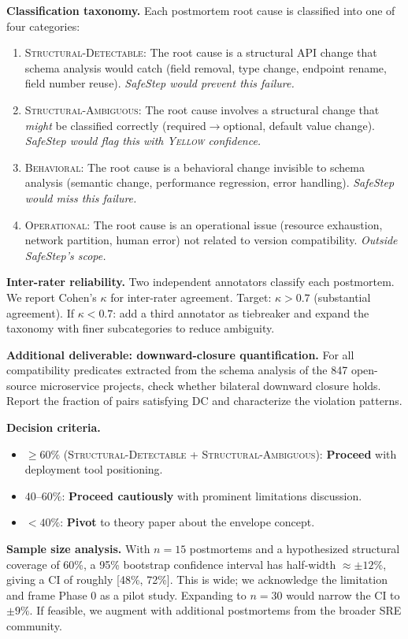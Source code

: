 \documentclass[10pt,twocolumn]{article}
\begin{document}
\textbf{Classification taxonomy.} Each postmortem root cause is classified into one of four categories:
\begin{enumerate}
\item \textsc{Structural-Detectable}: The root cause is a structural API change that schema analysis would catch (field removal, type change, endpoint rename, field number reuse). \emph{SafeStep would prevent this failure.}
\item \textsc{Structural-Ambiguous}: The root cause involves a structural change that \emph{might} be classified correctly (required$\to$optional, default value change). \emph{SafeStep would flag this with \textsc{Yellow} confidence.}
\item \textsc{Behavioral}: The root cause is a behavioral change invisible to schema analysis (semantic change, performance regression, error handling). \emph{SafeStep would miss this failure.}
\item \textsc{Operational}: The root cause is an operational issue (resource exhaustion, network partition, human error) not related to version compatibility. \emph{Outside SafeStep's scope.}
\end{enumerate}

\textbf{Inter-rater reliability.} Two independent annotators classify each postmortem. We report Cohen's $\kappa$ for inter-rater agreement. Target: $\kappa > 0.7$ (substantial agreement). If $\kappa < 0.7$: add a third annotator as tiebreaker and expand the taxonomy with finer subcategories to reduce ambiguity.

\textbf{Additional deliverable: downward-closure quantification.} For all compatibility predicates extracted from the schema analysis of the 847 open-source microservice projects, check whether bilateral downward closure holds. Report the fraction of pairs satisfying DC and characterize the violation patterns.

\textbf{Decision criteria.}
\begin{itemize}
\item $\geq 60\%$ (\textsc{Structural-Detectable} + \textsc{Structural-Ambiguous}): \textbf{Proceed} with deployment tool positioning.
\item $40$--$60\%$: \textbf{Proceed cautiously} with prominent limitations discussion.
\item $< 40\%$: \textbf{Pivot} to theory paper about the envelope concept.
\end{itemize}

\textbf{Sample size analysis.} With $n = 15$ postmortems and a hypothesized structural coverage of 60\%, a 95\% bootstrap confidence interval has half-width $\approx \pm 12\%$, giving a CI of roughly [48\%, 72\%]. This is wide; we acknowledge the limitation and frame Phase 0 as a pilot study. Expanding to $n = 30$ would narrow the CI to $\pm 9\%$. If feasible, we augment with additional postmortems from the broader SRE community.
\end{document}
